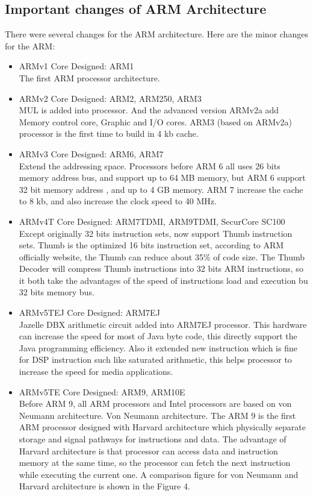 \documentclass[conference]{IEEEtran}
\begin{document}
\subsection{Important changes of ARM Architecture}
There were several changes for the ARM architecture. Here are the minor changes for the ARM:
\begin{itemize} 
\item{ARMv1} Core Designed: ARM1
\\The first ARM processor architecture. 

\item{ARMv2} Core Designed: ARM2, ARM250, ARM3
\\MUL is added into processor. And the advanced version ARMv2a add Memory control core, Graphic and I/O cores. ARM3 (based on ARMv2a) processor is the first time to build in 4 kb cache.  

\item{ARMv3} Core Designed: ARM6, ARM7
\\Extend the addressing space. Processors before ARM 6 all uses 26 bits memory address bus, and support up to 64 MB memory, but ARM 6 support 32 bit memory address , and up to 4 GB memory. ARM 7 increase the cache to 8 kb, and also increase the clock speed to 40 MHz.

\item{ARMv4T} Core Designed: ARM7TDMI, ARM9TDMI, SecurCore SC100
\\Except originally 32 bits instruction sets, now support Thumb instruction sets. Thumb is the optimized 16 bits instruction set, according to  ARM officially website, the Thumb can reduce about 35\% of code size. The Thumb Decoder will compress Thumb instructions into 32 bits ARM instructions, so it both take the advantages of the speed of instructions load and execution bu 32 bits memory bus.


\item{ARMv5TEJ} Core Designed: ARM7EJ
\\Jazelle DBX arithmetic  circuit added into ARM7EJ processor. This hardware can increase the speed for most of Java byte code, this directly support the Java programming efficiency. Also it extended new instruction which is fine for DSP instruction such like saturated arithmetic, this helps processor to increase the speed for media applications. 

\item{ARMv5TE} Core Designed: ARM9, ARM10E
\\Before ARM 9, all ARM processors and Intel processors are based on von Neumann architecture. Von Neumann architecture. The ARM 9 is the first ARM processor designed with Harvard architecture which physically separate storage and signal pathways for instructions and data. The advantage  of Harvard architecture is that processor can access data and instruction memory at the same time, so the processor can fetch the next instruction while executing the current one. A comparison figure for von Neumann and Harvard architecture is shown in the Figure 4.


\end{itemize}
\end{document}
